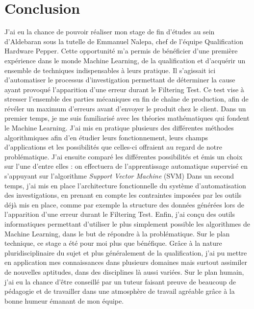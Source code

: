 \chapter{Conclusion}
\label{Conclusion}
\thispagestyle{fancy}

J'ai eu la chance de pouvoir réaliser mon stage de fin d'études au sein d'Aldebaran sous la tutelle de Emmanuel Nalepa, chef de l'équipe Qualification Hardware Pepper. Cette opportunité m'a permis de bénéficier d'une première expérience dans le monde Machine Learning, de la qualification et d'acquérir un ensemble de techniques indispensables à leurs pratique. Il s'agissait ici d'automatiser le processus d'investigation permettant de déterminer la cause ayant provoqué l'apparition d'une erreur durant le Filtering Test. Ce test vise à stresser l'ensemble des parties mécaniques en fin de chaîne de production, afin de révéler un maximum d'erreurs avant d'envoyer le produit chez le client.
\newline
\newline
Dans un premier temps, je me suis familiarisé avec les théories mathématiques qui fondent le Machine Learning. J'ai mis en pratique plusieurs des différentes méthodes algorithmiques afin d'en étudier leurs fonctionnement, leurs champs d'applications et les possibilités que celles-ci offraient au regard de notre problématique. J'ai ensuite comparé les différentes possibilités et émis un choix sur l'une d'entre elles : on effectuera de l'apprentissage automatique supervisé en s'appuyant sur l'algorithme \emph{Support Vector Machine} (SVM)
\newline
Dans un second temps, j'ai mis en place l'architecture fonctionnelle du système d'automatisation des investigations, en prenant en compte les contraintes imposées par les outils déjà mis en place, comme par exemple la structure des données générées lors de l'apparition d'une erreur durant le Filtering Test. 
\newline
Enfin, j'ai conçu des outils informatiques permettant d'utiliser le plus simplement possible les algorithmes de Machine Learning, dans le but de répondre à la problématique. 
\newline
\newline
Sur le plan technique, ce stage a été pour moi plus que bénéfique. Grâce à la nature pluridisciplinaire du sujet et plus généralement de la qualification, j'ai pu mettre en application mes connaissances dans plusieurs domaines mais surtout assimiler de nouvelles aptitudes, dans des disciplines là aussi variées. Sur le plan humain, j'ai eu la chance d’être conseillé par un tuteur faisant preuve de beaucoup de pédagogie et de travailler dans une atmosphère de travail agréable grâce à la bonne humeur émanant de mon équipe.
